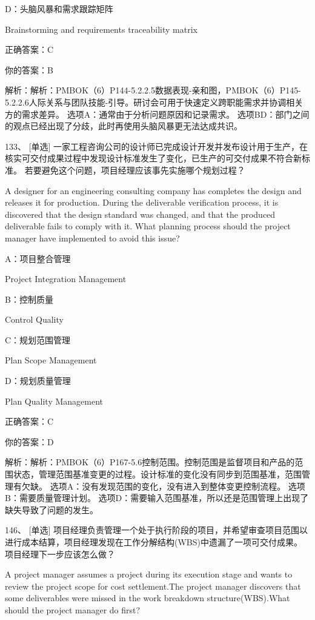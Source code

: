 D：头脑风暴和需求跟踪矩阵

Brainstorming and requirements traceability matrix

正确答案：C

你的答案：B

解析：解析：PMBOK（6）P144-5.2.2.5数据表现-亲和图，PMBOK（6）P145-5.2.2.6人际关系与团队技能-引导。研讨会可用于快速定义跨职能需求并协调相关方的需求差异。 选项A：通常由于分析问题原因和记录需求。 选项BD：部门之间的观点已经出现了分歧，此时再使用头脑风暴更无法达成共识。



133、 [单选] 一家工程咨询公司的设计师已完成设计开发并发布设计用于生产，在核实可交付成果过程中发现设计标准发生了变化，已生产的可交付成果不符合新标准。 若要避免这个问题，项目经理应该事先实施哪个规划过程？

A designer for an engineering consulting company has completes the design and releases it for production. During the deliverable verification process, it is discovered that the design standard was changed, and that the produced deliverable fails to comply with it. What planning process should the project manager have implemented to avoid this issue?

A：项目整合管理

Project Integration Management

B：控制质量

Control Quality

C：规划范围管理

Plan Scope Management

D：规划质量管理

Plan Quality Management

正确答案：C

你的答案：D

解析：解析：PMBOK（6）P167-5.6控制范围。控制范围是监督项目和产品的范围状态，管理范围基准变更的过程。设计标准的变化没有同步到范围基准，范围管理有欠缺。 选项A：没有发现范围的变化，没有进入到整体变更控制流程。 选项B：需要质量管理计划。 选项D：需要输入范围基准，所以还是范围管理上出现了缺失导致了问题的发生。


146、 [单选] 项目经理负责管理一个处于执行阶段的项目，并希望审查项目范围以进行成本结算，项目经理发现在工作分解结构(WBS)中遗漏了一项可交付成果。项目经理下一步应该怎么做？

A project manager assumes a project during its execution stage and wants to review the project scope for cost settlement.The project manager discovers that some deliverables were missed in the work breakdown structure(WBS).What should the project manager do first?

